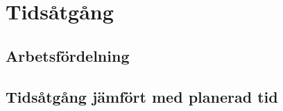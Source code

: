 
\section{Tidsåtgång}

\subsection{Arbetsfördelning}

\subsection{Tidsåtgång jämfört med planerad tid}
